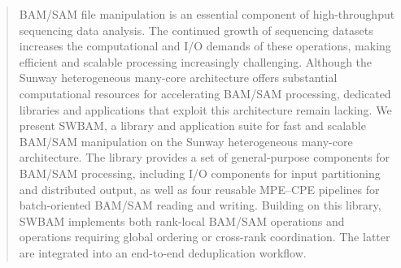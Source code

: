 \documentclass[lettersize,journal]{IEEEtran}
\begin{document}
\begin{abstract}
BAM/SAM file manipulation is an essential component of high-throughput sequencing data analysis. 
The continued growth of sequencing datasets increases the computational and I/O demands of these operations, making efficient and scalable processing increasingly challenging. 
Although the Sunway heterogeneous many-core architecture offers substantial computational resources for accelerating BAM/SAM processing, dedicated libraries and applications that exploit this architecture remain lacking.
We present SWBAM, a library and application suite for fast and scalable BAM/SAM manipulation on the Sunway heterogeneous many-core architecture. 
The library provides a set of general-purpose components for BAM/SAM processing, including I/O components for input partitioning and distributed output, as well as four reusable MPE–CPE pipelines for batch-oriented BAM/SAM reading and writing.
Building on this library, SWBAM implements both rank-local BAM/SAM operations and operations requiring global ordering or cross-rank coordination. 
The latter are integrated into an end-to-end deduplication workflow.

\end{abstract}
\end{document}
